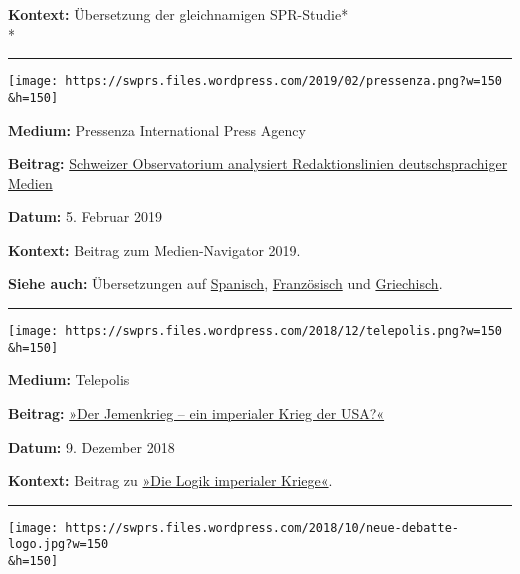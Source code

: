 \textbf{Kontext:} Übersetzung der gleichnamigen SPR-Studie*\\
*

\begin{center}\rule{0.5\linewidth}{\linethickness}\end{center}

\texttt{[image: https://swprs.files.wordpress.com/2019/02/pressenza.png?w=150\\\&h=150]}

\textbf{Medium:} Pressenza International Press Agency

\textbf{Beitrag:}
\href{https://www.pressenza.com/de/2019/02/schweizer-observatorium-analysiert-redaktionslinien-deutschsprachiger-medien/}{Schweizer
Observatorium analysiert Redaktionslinien deutschsprachiger Medien}

\textbf{Datum:} 5. Februar 2019

\textbf{Kontext:} Beitrag zum Medien-Navigator 2019.

\textbf{Siehe auch:} Übersetzungen auf
\href{https://www.pressenza.com/es/2019/01/observatorio-suizo-analizo-lineas-editoriales-de-medios-de-habla-alemana/}{Spanisch},
\href{https://www.pressenza.com/fr/2019/02/analyse-des-lignes-editoriales-des-medias-de-langue-allemande-par-un-observatoire-suisse/}{Französisch}
und
\href{https://www.pressenza.com/el/2019/02/elvetiko-paratiritirio-analiei-sintaktikes-grammes-germanofonon-meson-enimerosis/}{Griechisch}.

\begin{center}\rule{0.5\linewidth}{\linethickness}\end{center}

\texttt{[image: https://swprs.files.wordpress.com/2018/12/telepolis.png?w=150\\\&h=150]}

\textbf{Medium:} Telepolis

\textbf{Beitrag:}
\href{https://www.heise.de/tp/features/Der-Jemenkrieg-ein-imperialer-Krieg-der-USA-4245116.html}{»Der
Jemenkrieg -- ein imperialer Krieg der USA?«}

\textbf{Datum:} 9. Dezember 2018

\textbf{Kontext:} Beitrag zu
\href{https://swprs.org/logik-imperialer-kriege/}{»Die Logik imperialer
Kriege«}.

\begin{center}\rule{0.5\linewidth}{\linethickness}\end{center}

\texttt{[image: https://swprs.files.wordpress.com/2018/10/neue-debatte-logo.jpg?w=150\\\&h=150]}

